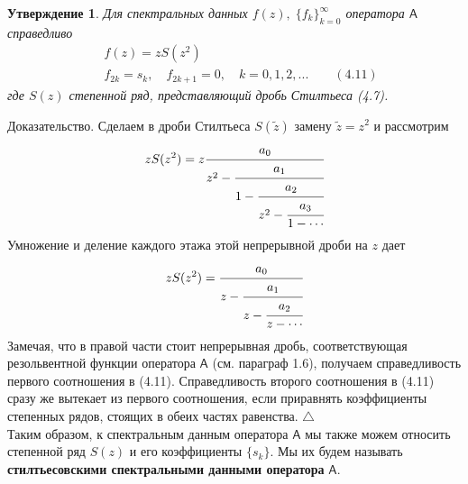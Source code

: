 \documentclass[12pt,a4paper]{article}
\theoremstyle{plain}   \newtheorem{Pro}{Задача}
\newtheorem{Sta}{Утверждение}
\begin{document}
\begin{Sta}
Для спектральных данных
$ f(z), \; \{ f_k \} _{k=0}^{\infty} $
оператора
$ \mathsf{A} $
справедливо
\begin{align*}
  \; & f(z)=zS(z^2 ) \\
  \; & f_{2k}=s_k , \quad f_{2k+1}=0, \quad
  k=0,1,2,... \qquad (4.11)
\end{align*}
где
$ S(z) $
степенной ряд, представляющий дробь Стилтьеса (4.7).
\end{Sta}
{\Large Доказательство.}
Сделаем в дроби Стилтьеса
$ S(\tilde z ) $
замену
$ \tilde z =z^2 $
и рассмотрим
\begin{equation*}
  zS(z^2 )=z
     \cfrac{a_0}{z^2 -
	   \cfrac{a_1}{1-
	     \cfrac{a_2}{z^2 -
		   \cfrac{a_3}{1-\dotsb
	  }}}}
\end{equation*}
Умножение и деление каждого этажа этой непрерывной дроби на
$ z $
дает
\begin{equation*}
  zS(z^2 )=
    \cfrac{a_0}{z-
	  \cfrac{a_1}{z-
	    \cfrac{a_2}{z-\dotsb
	}}}
\end{equation*}
Замечая, что в правой части стоит непрерывная дробь,
соответствующая резольвентной функции оператора
$ \mathsf{A} $
(см. параграф 1.6), получаем справедливость первого
соотношения в (4.11). Справедливость второго соотношения
в (4.11) сразу же вытекает из первого соотношения,
если приравнять коэффициенты степенных рядов,
стоящих в обеих частях равенства.
$ \triangle $ \\
Таким образом, к спектральным данным оператора
$ \mathsf{A} $
мы также можем относить степенной ряд
$ S(z) $
и его коэффициенты
$ \{ s_k \} . $
Мы их будем называть
{\bfseries стилтьесовскими спектральными данными оператора}
$ \mathsf{A}. $
\newpage
\end{document}
